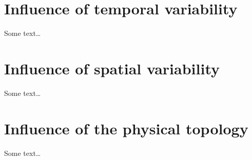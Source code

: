 
    \section{Influence of temporal variability}%
    \label{sec:influence_of_temporal_variability}
        Some text\dots

    \section{Influence of spatial variability}%
    \label{sec:influence_of_spatial_variability}
        Some text\dots

    \section{Influence of the physical topology}%
    \label{sec:influence_of_physical_topology}
        Some text\dots
